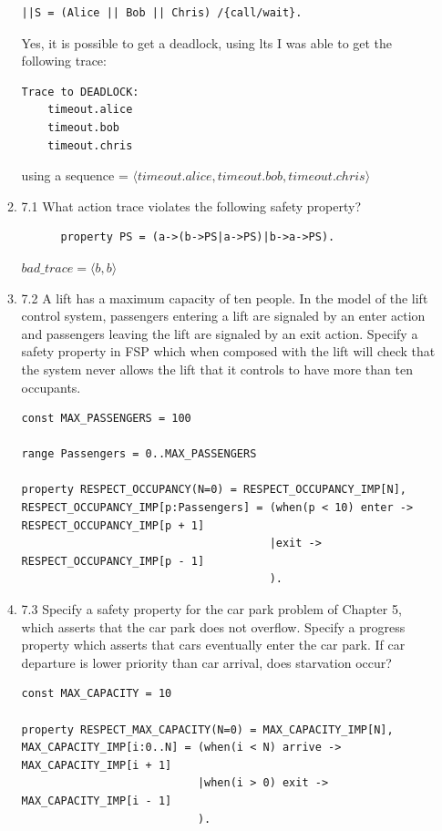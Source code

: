 \documentclass{article}
\begin{document}
\begin{enumerate}
\begin{enumerate}
\begin{verbatim}
||S = (Alice || Bob || Chris) /{call/wait}.
\end{verbatim}
Yes, it is possible to get a deadlock, using lts I was able to get the following trace:
\begin{verbatim}
Trace to DEADLOCK:
	timeout.alice
	timeout.bob
	timeout.chris
\end{verbatim}
using a sequence = $\langle timeout.alice, timeout.bob, timeout.chris \rangle$ \\
  \item 7.1 
    What action trace violates the following safety property?
    \begin{verbatim}
      property PS = (a->(b->PS|a->PS)|b->a->PS). 
   \end{verbatim}
    $bad\_trace = \langle b, b \rangle$ \\    
  \item 7.2 
    A lift has a maximum capacity of ten people. In the model of the lift control system, passengers entering a lift are signaled by an enter action and passengers leaving the lift are signaled by an exit action. Specify a safety property in FSP which when composed with the lift will check that the system never allows the lift that it controls to have more than ten occupants. \\
\begin{verbatim}
const MAX_PASSENGERS = 100

range Passengers = 0..MAX_PASSENGERS

property RESPECT_OCCUPANCY(N=0) = RESPECT_OCCUPANCY_IMP[N],
RESPECT_OCCUPANCY_IMP[p:Passengers] = (when(p < 10) enter -> RESPECT_OCCUPANCY_IMP[p + 1]
                                      |exit -> RESPECT_OCCUPANCY_IMP[p - 1]
                                      ).
  \end{verbatim}
  \item 7.3 
   Specify a safety property for the car park problem of Chapter 5, which asserts that the car park does not overflow. Specify a progress property which asserts that cars eventually enter the car park. If car departure is lower priority than car arrival, does starvation occur? \\

\begin{verbatim}
const MAX_CAPACITY = 10

property RESPECT_MAX_CAPACITY(N=0) = MAX_CAPACITY_IMP[N],
MAX_CAPACITY_IMP[i:0..N] = (when(i < N) arrive -> MAX_CAPACITY_IMP[i + 1]
                           |when(i > 0) exit -> MAX_CAPACITY_IMP[i - 1] 
                           ).


\end{verbatim}
\end{enumerate}
\end{enumerate}
\end{document}
